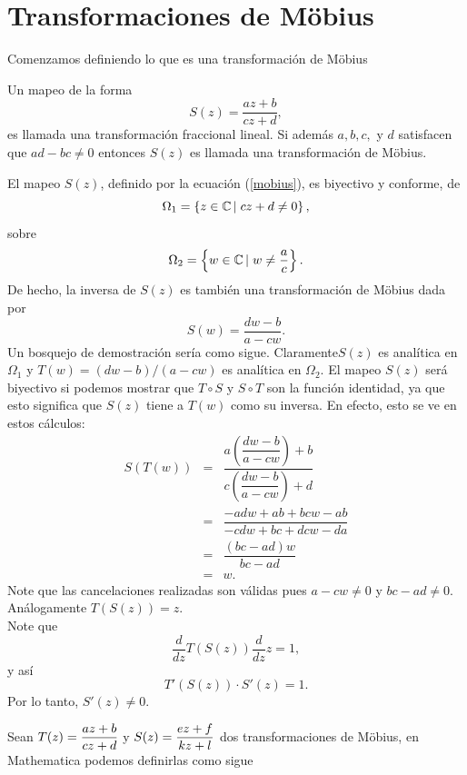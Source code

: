 \section{Transformaciones de Möbius} \label{Möbius}

Comenzamos definiendo lo que es una transformación de Möbius
\begin{defi}
	Un mapeo de la forma 
	\begin{equation}\label{mobius}
		S(z)=\dfrac{az+b}{cz+d},
	\end{equation}
	 es llamada una transformación fraccional lineal. Si  además $a, b, c,$ y $d$ satisfacen que $ad-bc\neq 0$ entonces $S(z)$ es llamada una  transformación de Möbius.
\end{defi}

\begin{prop}\label{prop3}
	El mapeo $S(z)$, definido por la ecuación (\ref{mobius}), es biyectivo y conforme, de
	$$\Omega_{1}=\left\{z\in\mathbb{C} \left|\right. cz+d\neq 0\right\},$$
	sobre 
	$$\Omega_{2}=\left\{w\in\mathbb{C} \left|\right. w\neq \dfrac{a}{c}\right\}.$$
	De hecho, la inversa de $S(z)$ es también una transformación de Möbius dada por
	\begin{equation}\label{invMobius}
		S(w)=\dfrac{dw-b}{a-cw}.
	\end{equation}
Un bosquejo de demostración sería como sigue. Claramente$S(z)$ es analítica en $\Omega_{1}$ y $T(w) = (dw - b)/(a-cw)$ es
analítica en $\Omega_{2}$. El mapeo $S(z)$ será biyectivo si podemos mostrar que $T \circ S$ y $S \circ T$ son la función identidad, ya que esto significa que $S(z)$ tiene a $T(w)$ como su inversa. En efecto, esto se ve en estos cálculos:
\[
\begin{array}{ccl}
	S(T(w))&=&\dfrac{a\left(\dfrac{dw-b}{a-cw} \right) +b}{c\left(\dfrac{dw-b}{a-cw}\right)+d}\\
	&=&\dfrac{-adw+ab+bcw-ab}{-cdw+bc+dcw-da}\\
	&=&\dfrac{(bc-ad)w}{bc-ad}\\
	&=&w.
\end{array}
\]
Note que las cancelaciones realizadas son válidas pues $a-cw\neq  0$ y $bc-ad\neq 0$. Análogamente $T(S(z)) =z$.\\ 
Note que 
$$\dfrac{d}{dz}T(S(z))\dfrac{d}{dz}z=1,$$
y así $$T'(S(z))\cdot S'(z)=1.$$
Por lo tanto, $S'(z)\neq 0$.
\end{prop}
Sean $T(z)=\dfrac{az+b}{cz+d}$ y $S(z)=\dfrac{ez+f}{kz+l}$ dos transformaciones de M\"obius, en Mathematica podemos definirlas como sigue


